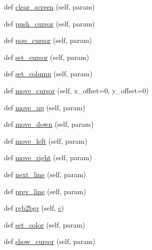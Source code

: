 \begin{DoxyCompactItemize}
\item 
def \hyperlink{classwaflib_1_1ansiterm_1_1_ansi_term_aa94cc04f29c4c51e0013e5cb87c0fd07}{clear\+\_\+screen} (self, param)
\item 
def \hyperlink{classwaflib_1_1ansiterm_1_1_ansi_term_a9f489138508401c64c6927f215d8d6da}{push\+\_\+cursor} (self, param)
\item 
def \hyperlink{classwaflib_1_1ansiterm_1_1_ansi_term_a2093c2f7ded18188b0bf2989a0083a18}{pop\+\_\+cursor} (self, param)
\item 
def \hyperlink{classwaflib_1_1ansiterm_1_1_ansi_term_aba842837a7fe351aa8459aa375249c69}{set\+\_\+cursor} (self, param)
\item 
def \hyperlink{classwaflib_1_1ansiterm_1_1_ansi_term_acd65956a7d56681cc669acca5bdd43fb}{set\+\_\+column} (self, param)
\item 
def \hyperlink{classwaflib_1_1ansiterm_1_1_ansi_term_ade95c6eb1c7ed7928780aad4e6b4e268}{move\+\_\+cursor} (self, x\+\_\+offset=0, y\+\_\+offset=0)
\item 
def \hyperlink{classwaflib_1_1ansiterm_1_1_ansi_term_a7725bd9ed185458669ad7601fb7ff9d9}{move\+\_\+up} (self, param)
\item 
def \hyperlink{classwaflib_1_1ansiterm_1_1_ansi_term_a7b2ea0403457b7cd8d0ac4088064d812}{move\+\_\+down} (self, param)
\item 
def \hyperlink{classwaflib_1_1ansiterm_1_1_ansi_term_a617dda0ced0a3e3f3443366d4a1c46bb}{move\+\_\+left} (self, param)
\item 
def \hyperlink{classwaflib_1_1ansiterm_1_1_ansi_term_a1388984c5cb5051d6c48682d1cd998b7}{move\+\_\+right} (self, param)
\item 
def \hyperlink{classwaflib_1_1ansiterm_1_1_ansi_term_a8ce79cf478dc1bf0cec2c12e28103522}{next\+\_\+line} (self, param)
\item 
def \hyperlink{classwaflib_1_1ansiterm_1_1_ansi_term_ac65f3453904e9c561f530b7c43e73f12}{prev\+\_\+line} (self, param)
\item 
def \hyperlink{classwaflib_1_1ansiterm_1_1_ansi_term_ad097d16ecb1babcef5970faccad1e7e9}{rgb2bgr} (self, \hyperlink{rfft2d_test_m_l_8m_ae0323a9039add2978bf5b49550572c7c}{c})
\item 
def \hyperlink{classwaflib_1_1ansiterm_1_1_ansi_term_a2b56ee3c8294f7e2e5bca7cc60e8ee05}{set\+\_\+color} (self, param)
\item 
def \hyperlink{classwaflib_1_1ansiterm_1_1_ansi_term_a594f6cf62d5e4ca33f2b88127fd6393d}{show\+\_\+cursor} (self, param)
\item 

\end{DoxyCompactItemize}
